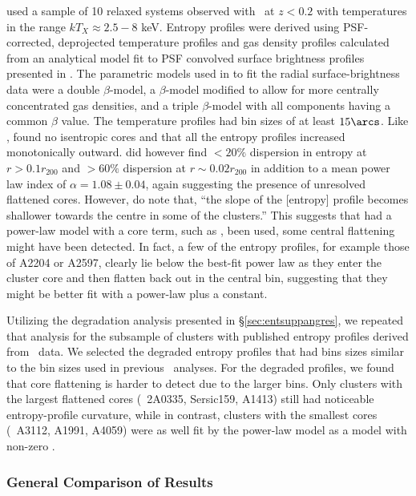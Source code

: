 \citet{pratt06} used a sample of 10 relaxed systems observed with
\xmm\ at $z < 0.2$ with temperatures in the range $kT_X \approx 2.5-8$
keV. Entropy profiles were derived using PSF-corrected, deprojected
temperature profiles and gas density profiles calculated from an
analytical model fit to PSF convolved surface brightness profiles
presented in \citet{2005A&A...435....1P}. The parametric models used
in \citet{2005A&A...435....1P} to fit the radial surface-brightness
data were a double $\beta$-model, a $\beta$-model modified to allow
for more centrally concentrated gas densities, and a triple
$\beta$-model with all components having a common $\beta$ value. The
temperature profiles had bin sizes of at least $15\arcs$. Like
\citet{piffaretti05}, \citet{pratt06} found no isentropic cores and
that all the entropy profiles increased monotonically
outward. \citet{pratt06} did however find $< 20\%$ dispersion in
entropy at $r > 0.1r_{200}$ and $> 60\%$ dispersion at $r \sim
0.02r_{200}$ in addition to a mean power law index of $\alpha = 1.08
\pm 0.04$, again suggesting the presence of unresolved flattened
cores. However, \citet{pratt06} do note that, ``the slope of the
[entropy] profile becomes shallower towards the centre in some of the
clusters.'' This suggests that had a power-law model with a core term,
such as \kna, been used, some central flattening might have been
detected. In fact, a few of the \citet{pratt06} entropy profiles, for
example those of A2204 or A2597, clearly lie below the best-fit power
law as they enter the cluster core and then flatten back out in the
central bin, suggesting that they might be better fit with a power-law
plus a constant.

Utilizing the degradation analysis presented in \S \ref{sec:entsuppangres},
we repeated that analysis for the subsample of clusters with published
entropy profiles derived from \xmm\ data. We selected the degraded
entropy profiles that had bins sizes similar to the bin sizes used in
previous \xmm\ analyses. For the degraded profiles, we found that core
flattening is harder to detect due to the larger bins. Only clusters
with the largest flattened cores (\eg\ 2A0335, Sersic159, A1413) still
had noticeable entropy-profile curvature, while in contrast, clusters
with the smallest cores (\eg\ A3112, A1991, A4059) were as well fit by
the power-law model as a model with non-zero \kna.

\subsubsection{General Comparison of Results}

